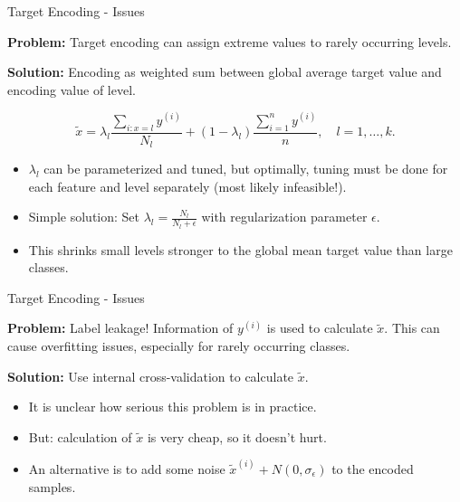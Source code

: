 \documentclass[11pt,compress,t,notes=noshow, xcolor=table]{beamer}
\begin{document}

\begin{vbframe}{Target Encoding - Issues}

\textbf{Problem:} Target encoding can assign extreme values to rarely occurring levels.

\textbf{Solution:} Encoding as weighted sum between global average target value and encoding value of level.

$$\tilde x = \lambda_l\frac{\sum_{i:x=l}y^{(i)}}{N_l} + (1-\lambda_l)\frac{\sum_{i=1}^n y^{(i)}}{n}, \quad l=1,\dots,k.$$

\begin{itemize}
    \item $\lambda_l$ can be parameterized and tuned, but optimally, tuning must be done for each feature and level separately (most likely infeasible!).
    \item Simple solution: Set $\lambda_l=\frac{N_l}{N_l+\epsilon}$ with regularization parameter $\epsilon$.
    \item This shrinks small levels stronger to the global mean target value than large classes.
\end{itemize}



\end{vbframe}


\begin{vbframe}{Target Encoding - Issues}

\textbf{Problem:} Label leakage! Information of $y^{(i)}$ is used to calculate $\tilde x$. This can cause overfitting issues, especially for rarely occurring classes.

\textbf{Solution:} Use internal cross-validation to calculate $\tilde x$.

\begin{itemize}
    \item It is unclear how serious this problem is in practice.
    \item But: calculation of $\tilde x$ is very cheap, so it doesn't hurt.
    \item An alternative is to add some noise $\tilde x^{(i)} + N(0,\sigma_\epsilon)$ to the encoded samples.
\end{itemize}

\end{vbframe}

\endlecture
\end{document}
